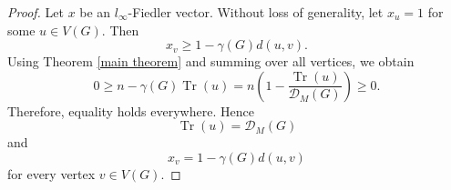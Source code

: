 \documentclass[10pt,a4paper]{amsart}
\DeclareMathOperator{\tr}{Tr}
\begin{document}
				\begin{proof}
					Let $x$ be an $l_\infty$-Fiedler vector. Without loss of generality, let $x_u=1$ for some $u \in V(G)$. Then
					$$
					x_v \geq 1- \gamma(G) d(u,v).
					$$
					Using Theorem \ref{main theorem} and summing over all vertices, we obtain
					$$
					0\geq n-\gamma(G) \tr(u)=n(1-\frac{\tr(u)}{\mathcal{D}_M(G)})\geq 0.
					$$
					Therefore, equality holds everywhere. Hence 
					$$
					\tr(u)=\mathcal{D}_M(G)
					$$
					and 
					$$
					x_v = 1- \gamma(G) d(u,v)
					$$
					for every vertex $v \in V(G)$.
				\end{proof}
\end{document}
